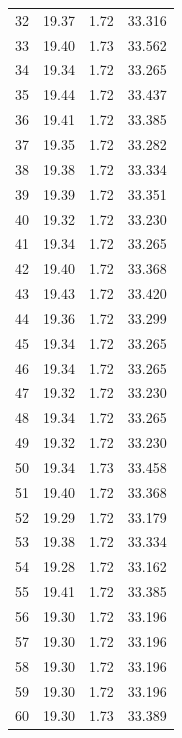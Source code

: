 \begin{table}[htbp]
\begin{tabular}{c S[table-format=2.2] S[table-format=1.2] S[table-format=2.3]}
32 & 19.37 & 1.72 & 33.316 \\
33 & 19.40 & 1.73 & 33.562 \\
34 & 19.34 & 1.72 & 33.265 \\
35 & 19.44 & 1.72 & 33.437 \\
36 & 19.41 & 1.72 & 33.385 \\
37 & 19.35 & 1.72 & 33.282 \\
38 & 19.38 & 1.72 & 33.334 \\
39 & 19.39 & 1.72 & 33.351 \\
40 & 19.32 & 1.72 & 33.230 \\
41 & 19.34 & 1.72 & 33.265 \\
42 & 19.40 & 1.72 & 33.368 \\
43 & 19.43 & 1.72 & 33.420 \\
44 & 19.36 & 1.72 & 33.299 \\
45 & 19.34 & 1.72 & 33.265 \\
46 & 19.34 & 1.72 & 33.265 \\
47 & 19.32 & 1.72 & 33.230 \\
48 & 19.34 & 1.72 & 33.265 \\
49 & 19.32 & 1.72 & 33.230 \\
50 & 19.34 & 1.73 & 33.458 \\
51 & 19.40 & 1.72 & 33.368 \\
52 & 19.29 & 1.72 & 33.179 \\
53 & 19.38 & 1.72 & 33.334 \\
54 & 19.28 & 1.72 & 33.162 \\
55 & 19.41 & 1.72 & 33.385 \\
56 & 19.30 & 1.72 & 33.196 \\
57 & 19.30 & 1.72 & 33.196 \\
58 & 19.30 & 1.72 & 33.196 \\
59 & 19.30 & 1.72 & 33.196 \\
60 & 19.30 & 1.73 & 33.389 \\
\bottomrule
\end{tabular}
\end{table}
